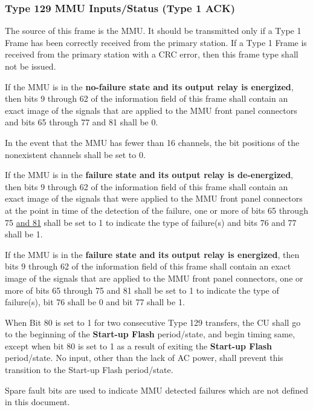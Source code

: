 \documentclass[]{article}
\begin{document}
\clearpage

\subsubsection {Type 129 MMU Inputs/Status (Type 1 ACK)}

The source of this frame is the MMU. It should be transmitted only if a Type 1 Frame has been correctly received from the primary station. If a Type 1 Frame is received from the primary station with a CRC error, then this frame type shall not be issued.

If the MMU is in the \textbf{no-failure state and its output relay is energized}, then bits 9 through 62 of the information field of this frame shall contain an exact image of the signals that are applied to the MMU front panel connectors and bits 65 through 77 and 81 shall be 0.

In the event that the MMU has fewer than 16 channels, the bit positions of the nonexistent channels shall be set to 0.

If the MMU is in the\textbf{ failure state and its output relay is de-energized}, then bits 9 through 62 of the information field of this frame shall contain an exact image of the signals that were applied to the MMU front panel connectors at the point in time of the detection of the failure, one or more of bits 65 through 75 \underline{and 81} shall be set to 1 to indicate the type of failure(s) and bits 76 and 77 shall be 1.

If the MMU is in the \textbf{failure state and its output relay is energized}, then bits 9 through 62 of the information field of this frame shall contain an exact image of the signals that are applied to the MMU front panel connectors, one or more of bits 65 through 75 and 81 shall be set to 1 to indicate the type of failure(s), bit 76 shall be 0 and bit 77 shall be 1.

When Bit 80 is set to 1 for two consecutive Type 129 transfers, the CU shall go to the beginning of the \textbf{Start-up Flash} period/state, and begin timing same, except when bit 80 is set to 1 as a result of exiting the \textbf{Start-up Flash} period/state. No input, other than the lack of AC power, shall prevent this transition to the Start-up Flash period/state.

Spare fault bits are used to indicate MMU detected failures which are not defined in this document.
\end{document}
